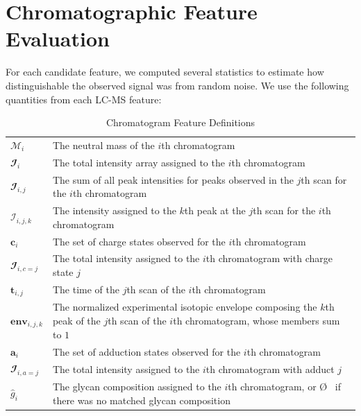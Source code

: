 \section{Chromatographic Feature Evaluation}\label{sec:feature_evaluation}
    For each candidate feature, we computed several statistics to estimate how distinguishable
    the observed signal was from random noise. We use the following quantities from each LC-MS
    feature:

    \renewcommand{\arraystretch}{1.5}
    \begin{table}
        \caption{Chromatogram Feature Definitions}\label{tbl:chromatogram_feature_definitions}
        \centering
        \begin{tabular}{l | p{9cm}}
            \hline
            $\mathcal{M}_i$ & The neutral mass of the $i$th chromatogram\\
            $\mathbfcal{I}_i$ & The total intensity array assigned to the $i$th chromatogram\\
            $\mathbfcal{I}_{i, j}$ & The sum of all peak intensities for peaks observed in
                                             the $j$th scan for the $i$th chromatogram\\
            $\mathcal{I}_{i, j, k}$ & The intensity assigned to the $k$th peak at the $j$th
                                      scan for the $i$th chromatogram\\
            $\mathbf{c}_i$ & The set of charge states observed for the $i$th chromatogram\\
            $\mathbfcal{I}_{i, c=j}$ & The total intensity assigned to the $i$th chromatogram
                                     with charge state $j$\\
            $\mathbf{t}_{i, j}$ & The time of the $j$th scan of the $i$th chromatogram\\
            $\textbf{env}_{i, j, k}$ & The normalized experimental isotopic envelope composing
                                     the $k$th peak of the $j$th scan of the $i$th chromatogram,
                                     whose members sum to $1$\\
            $\mathbf{a}_i$ & The set of adduction states observed for the $i$th chromatogram\\
            $\mathbfcal{I}_{i, a=j}$ & The total intensity assigned to the $i$th
                                                 chromatogram with adduct $j$\\
            ${\hat g}_i$ & The glycan composition assigned to the $i$th chromatogram, or \O
                           \ if there was no matched glycan composition
        \end{tabular}
    \end{table}
    \renewcommand{\arraystretch}{1.0}

